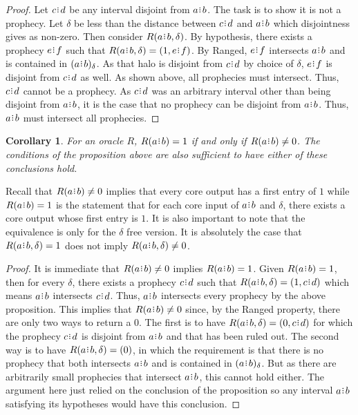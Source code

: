 \documentclass[12pt]{article}
\newtheorem{corollary}{Corollary}[section]
\begin{document}
\begin{proof}
     Let $c\rint d$ be any interval disjoint from $a\rint b$. The task is to show it is not a prophecy. Let $\delta$ be less than the distance between $c \rint d$ and $a \rint b$ which disjointness gives as non-zero. Then consider $R(a \rint b, \delta)$. By hypothesis, there exists a prophecy $e \rint f$ such that $R(a \rint b, \delta) = (1, e \rint f)$. By Ranged, $e \rint f$ intersects $a \rint b$ and is contained in $\halo[\delta]{a \rint b}$. As that halo is disjoint from $c \rint d$ by choice of $\delta$, $e \rint f$ is disjoint from $c\rint d$ as well. As shown above, all prophecies must intersect. Thus, $c\rint d$ cannot be a prophecy. As $c\rint d$ was an arbitrary interval other than being disjoint from $a\rint b$, it is the case that no prophecy can be disjoint from $a\rint b$. Thus, $a\rint b$ must intersect all prophecies.
\end{proof}

\begin{corollary}
    For an oracle $R$, $R(a\rint b) = 1$ if and only if $R(a\rint b) \neq 0$. The conditions of the proposition above are also sufficient to have either of these conclusions hold. 
\end{corollary}

Recall that $R(a \rint b) \neq 0$ implies that every core output has a first entry of $1$ while $R(a \rint b) = 1$ is the statement that for each core input of $a \rint b$ and $\delta$, there exists a core output whose first entry is $1$. It is also important to note that the equivalence is only for the $\delta$ free version. It is absolutely the case that $R(a \rint b, \delta) = 1$ does not imply $R(a \rint b, \delta) \neq 0$.

\begin{proof}
    It is immediate that $R(a\rint b) \neq 0$ implies $R(a \rint b) = 1$. Given $R(a\rint b)= 1$, then for every $\delta$, there exists a prophecy $c\rint d$ such that $R(a\rint b, \delta) = (1, c\rint d)$ which means $a \rint b$ intersects $c \rint d$. Thus, $a\rint b$ intersects every prophecy by the above proposition. This implies that $R(a\rint b) \neq 0$ since, by the Ranged property, there are only two ways to return a $0$. The first is to have $R(a\rint b, \delta) = (0, c\rint d)$ for which the prophecy $c\rint d$ is disjoint from $a\rint b$ and that has been ruled out. The second way is to have $R(a \rint b, \delta) = (0)$, in which the requirement is that there is no prophecy that both intersects $a \rint b$ and is contained in $\halo{a \rint b}$. But as there are arbitrarily small prophecies that intersect $a \rint b$, this cannot hold either. The argument here just relied on the conclusion of the proposition so any interval $a \rint b$ satisfying its hypotheses would have this conclusion. 
\end{proof}
\end{document}
